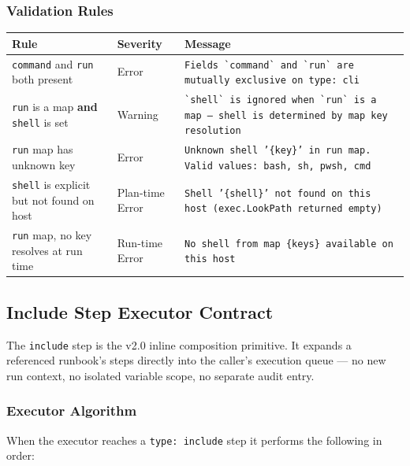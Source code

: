 \subsubsection*{Validation Rules}

\begin{center}
\begin{tabular}{|p{5.5cm}|l|p{6cm}|}
\hline
\textbf{Rule} & \textbf{Severity} & \textbf{Message} \\
\hline
\texttt{command} and \texttt{run} both present & Error &
  \texttt{Fields \`{}command\`{} and \`{}run\`{} are mutually exclusive on type: cli} \\
\hline
\texttt{run} is a map \textbf{and} \texttt{shell} is set & Warning &
  \texttt{\`{}shell\`{} is ignored when \`{}run\`{} is a map — shell is determined by
  map key resolution} \\
\hline
\texttt{run} map has unknown key & Error &
  \texttt{Unknown shell '\{key\}' in run map. Valid values: bash, sh, pwsh, cmd} \\
\hline
\texttt{shell} is explicit but not found on host & Plan-time Error &
  \texttt{Shell '\{shell\}' not found on this host (exec.LookPath returned empty)} \\
\hline
\texttt{run} map, no key resolves at run time & Run-time Error &
  \texttt{No shell from map \{keys\} available on this host} \\
\hline
\end{tabular}
\end{center}

\subsection{Include Step Executor Contract}
\label{sec:include_executor_contract}

The \texttt{include} step is the v2.0 inline composition primitive. It expands a referenced
runbook's steps directly into the caller's execution queue — no new run context, no isolated
variable scope, no separate audit entry.

\subsubsection*{Executor Algorithm}

When the executor reaches a \texttt{type: include} step it performs the following in order:

